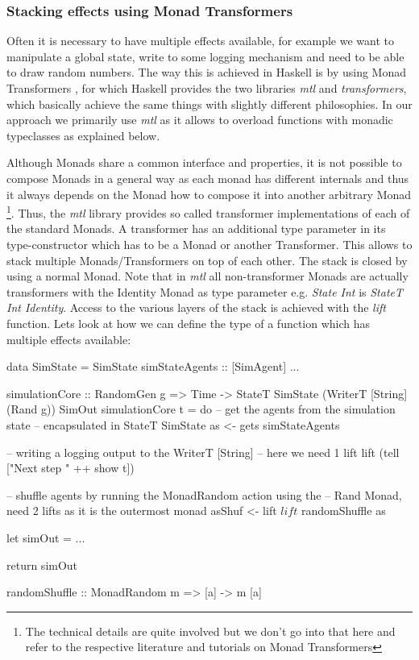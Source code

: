 \subsubsection{Stacking effects using Monad Transformers}
Often it is necessary to have multiple effects available, for example we want to manipulate a global state, write to some logging mechanism and need to be able to draw random numbers. The way this is achieved in Haskell is by using Monad Transformers \cite{jones_functional_1995}, for which Haskell provides the two libraries \textit{mtl} and \textit{transformers}, which basically achieve the same things with slightly different philosophies. In our approach we primarily use \textit{mtl} as it allows to overload functions with monadic typeclasses as explained below.

\medskip

Although Monads share a common interface and properties, it is not possible to compose Monads in a general way as each monad has different internals and thus it always depends on the Monad how to compose it into another arbitrary Monad \footnote{The technical details are quite involved but we don't go into that here and refer to the respective literature and tutorials on Monad Transformers}. Thus, the \textit{mtl} library provides so called transformer implementations of each of the standard Monads. A transformer has an additional type parameter in its type-constructor which has to be a Monad or another Transformer. This allows to stack multiple Monads/Transformers on top of each other. The stack is closed by using a normal Monad. Note that in \textit{mtl} all non-transformer Monads are actually transformers with the Identity Monad as type parameter e.g. \textit{State Int} is \textit{StateT Int Identity}. Access to the various layers of the stack is achieved with the \textit{lift} function. Lets look at how we can define the type of a function which has multiple effects available:

\begin{HaskellCode}
data SimState = SimState 
  { simStateAgents :: [SimAgent]
  ...
  }

simulationCore :: RandomGen g 
               => Time
               -> StateT SimState (WriterT [String] (Rand g)) SimOut
simulationCore t = do
  -- get the agents from the simulation state 
  -- encapsulated in StateT SimState
  as <- gets simStateAgents
  
  -- writing a logging output to the WriterT [String]
  -- here we need 1 lift 
  lift (tell ["Next step " ++ show t])
  
  -- shuffle agents by running the MonadRandom action using the
  -- Rand Monad, need 2 lifts as it is the outermost monad
  asShuf <- lift $ lift $ randomShuffle as
  
  let simOut = ...
  
  return simOut
  
randomShuffle :: MonadRandom m => [a] -> m [a]
\end{HaskellCode}

